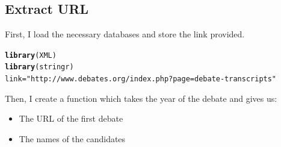 \documentclass{llncs}\usepackage[]{graphicx}\usepackage[]{color}
\makeatletter
\newcommand{\hlstr}[1]{\textcolor[rgb]{0.192,0.494,0.8}{#1}}%
\newcommand{\hlstd}[1]{\textcolor[rgb]{0.345,0.345,0.345}{#1}}%
\newcommand{\hlkwb}[1]{\textcolor[rgb]{0.69,0.353,0.396}{#1}}%
\newcommand{\hlkwd}[1]{\textcolor[rgb]{0.737,0.353,0.396}{\textbf{#1}}}%
\newenvironment{kframe}{%
 \def\at@end@of@kframe{}%
 \ifinner\ifhmode%
  \def\at@end@of@kframe{\end{minipage}}%
  \begin{minipage}{\columnwidth}%
 \fi\fi%
 \def\FrameCommand##1{\hskip\@totalleftmargin \hskip-\fboxsep
 \colorbox{shadecolor}{##1}\hskip-\fboxsep
     \hskip-\linewidth \hskip-\@totalleftmargin \hskip\columnwidth}%
 \MakeFramed {\advance\hsize-\width
   \@totalleftmargin\z@ \linewidth\hsize
   \@setminipage}}%
 {\par\unskip\endMakeFramed%
 \at@end@of@kframe}
\newenvironment{knitrout}{}{} %
\makeatother
\begin{document}
\subsection{Extract URL}
First, I load the necessary databases and store the link provided.
\begin{knitrout}
\color{fgcolor}\begin{kframe}
\begin{alltt}
\hlkwd{library}\hlstd{(XML)}
\hlkwd{library}\hlstd{(stringr)}
\hlstd{link}\hlkwb{=}\hlstr{"http://www.debates.org/index.php?page=debate-transcripts"}
\end{alltt}
\end{kframe}
\end{knitrout}
\noindent
Then, I create a function which takes the year of the debate and gives us:
\begin{itemize}
  \item The URL of the first debate
  \item The names of the candidates
\end{itemize}
\end{document}
